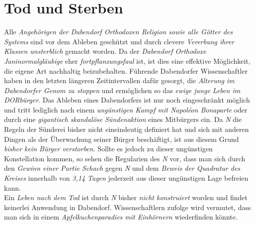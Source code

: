 \section{{Tod und Sterben}}\label{todsterben} 
Alle \textit{Angehörigen der Dabendorf Orthodoxen Religion sowie alle Götter des Systems} sind vor dem Ableben geschützt und durch clevere \textit{Vererbung ihrer Klassen unsterblich} gemacht worden. Da der \textit{Dabendorf Orthodoxe Janinormalgläubige} eher \textit{fortpflanzungsfaul} ist, ist dies eine effektive Möglichkeit, die eigene Art nachhaltig beizubehalten. Führende Dabendorfer Wissenschaftler haben in den letzten längeren Zeitintervallen dafür gesorgt, die \textit{Alterung im Dabendorfer Genom zu stoppen} und ermöglichen so das \textit{ewige junge Leben im DORbürger}. Das Ableben eines Dabendorfers ist nur noch eingeschränkt möglich und tritt lediglich nach einem \textit{ungünstigen Kampf mit Napoléon Bonaparte} oder durch eine \textit{gigantisch skandalöse Sündenaktion} eines Mitbürgers ein. Da \textit{N} die Regeln der Sünderei bisher nicht eineindeutig definiert hat und sich mit anderen Dingen als der Überwachung seiner Bürger beschäftigt, ist aus diesem Grund \textit{bisher kein Bürger verstorben}. Sollte es jedoch zu dieser ungünstigen Konstellation kommen, so sehen die Regularien des \textit{N} vor, dass man sich durch den \textit{Gewinn einer Partie Schach} gegen \textit{N} und dem \textit{Beweis der Quadratur des Kreises} innerhalb von \textit{3,14 Tagen} jederzeit aus dieser ungünstigen Lage befreien kann.\\
Ein \textit{Leben nach dem Tod} ist durch \textit{N} bisher \textit{nicht konstruiert} worden und findet keinerlei Anwendung in Dabendorf. Wissenschaftlern zufolge wird vermutet, dass man sich in einem \textit{Apfelkuchenparadies mit Einhörnern} wiederfinden könnte.